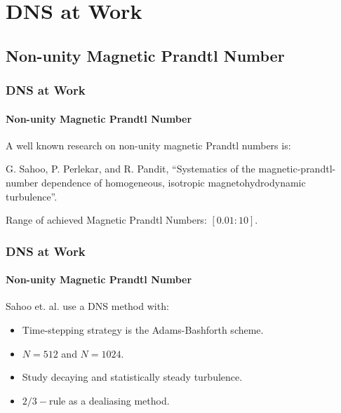\documentclass{beamer}
\begin{document}
\section{DNS at Work}

\subsection{Non-unity Magnetic Prandtl Number}

\begin{frame}
 \frametitle{DNS at Work}
 \framesubtitle{Non-unity Magnetic Prandtl Number}
 
 A well known research on non-unity magnetic Prandtl numbers is:\vspace{1cm}
 
 G. Sahoo, P. Perlekar, and R. Pandit, “Systematics of the magnetic-prandtl-number dependence of homogeneous, isotropic magnetohydrodynamic turbulence”.\vspace{1cm}\pause
 
 Range of achieved Magnetic Prandtl Numbers: $[0.01:10]$.
 
\end{frame}

\begin{frame}
 \frametitle{DNS at Work}
 \framesubtitle{Non-unity Magnetic Prandtl Number}
 
 Sahoo et. al. use a DNS method with:
 
 \begin{itemize}
  \item Time-stepping strategy is the Adams-Bashforth scheme. %
  \item<2-> $N = 512$ and $N = 1024$.
  \item<3-> Study decaying and statistically steady turbulence. 
  \item<4-> $2/3-$rule as a dealiasing method. 
 \end{itemize}

 
 
 
\end{frame}
\end{document}
